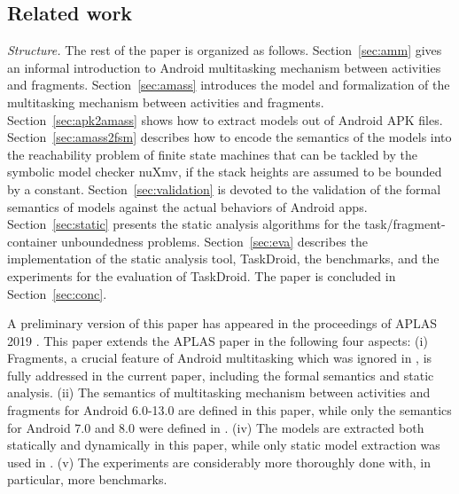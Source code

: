 
\subsection{Related work}\label{sec:related}

\medskip
 
\noindent\emph{Structure.} The rest of the paper is organized as follows. 
Section~\ref{sec:amm} gives an informal introduction to Android multitasking mechanism between activities and fragments. Section~\ref{sec:amass} introduces the model {\AMASS} and formalization of the multitasking mechanism  between activities and fragments. Section~\ref{sec:apk2amass} shows how to extract {\AMASS} models out of Android APK files. Section~\ref{sec:amass2fsm} describes how to encode the semantics of the {\AMASS} models into the reachability problem of finite state machines  that can be tackled by the symbolic model checker nuXmv, if the stack heights are assumed to be bounded by a constant. Section~\ref{sec:validation} is devoted to the validation of the formal semantics of {\AMASS} models against the actual behaviors of Android apps. 
Section~\ref{sec:static} presents the static analysis algorithms for the task/fragment-container unboundedness problems. 
Section~\ref{sec:eva} describes the implementation of the static analysis tool, TaskDroid, the benchmarks, and the experiments for the evaluation of TaskDroid. %
The paper is concluded in Section~\ref{sec:conc}. 

A preliminary version of this paper has appeared in the proceedings of APLAS 2019 \cite{HCWWY19}. This paper extends the APLAS paper in the following four aspects: (i) Fragments, a crucial feature of Android multitasking which was ignored in \cite{HCWWY19}, is fully addressed in the current paper, including the formal semantics and static analysis. (ii) The semantics of multitasking mechanism between activities and fragments for Android 6.0-13.0 are defined in this paper, while only the semantics for Android 7.0 and 8.0 were defined in \cite{HCWWY19}.  (iv) The models are extracted both statically and dynamically in this paper, while only static model extraction was used in \cite{HCWWY19}. (v) The experiments are considerably more thoroughly done with, in particular, more benchmarks.
 

